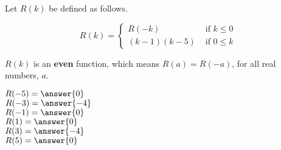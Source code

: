 \documentclass{ximera}
\author{Lee Wayand}
\begin{document}
\begin{exercise}




Let $R(k)$ be defined as follows.

\[
R(k) = 
\begin{cases}
  R(-k) & \text{ if }  k \le 0 \\
  (k-1)(k-5) & \text{ if } 0 \leq k 
\end{cases}
\]

$R(k)$ is an \textbf{even} function, which means $R(a) = R(-a)$, for all real numbers, $a$. \\


\begin{question}




$R(-5) = \answer{0}$ \\


$R(-3) = \answer{-4}$ \\


$R(-1) = \answer{0}$ \\


$R(1) = \answer{0}$ \\


$R(3) = \answer{-4}$ \\


$R(5) = \answer{0}$ \\




\end{question}


\end{exercise}
\end{document}
